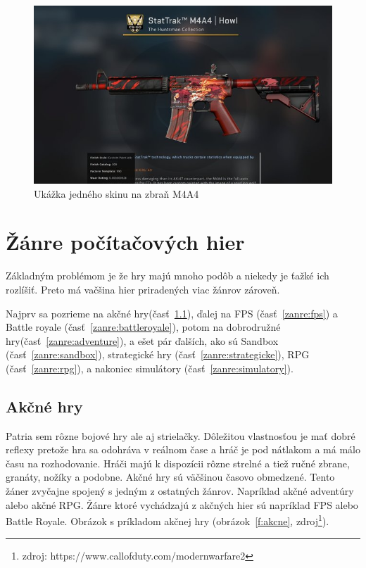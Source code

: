 \documentclass[10pt,oneside,slovak,a4paper]{article}
\begin{document}
\begin{figure}[tbh]
\centering
\includegraphics[scale=0.45]{skin.jpg}
\caption{Ukážka jedného skinu na zbraň M4A4}
\label{f:skiny}
\end{figure}



\section{Žánre počítačových hier} \label{zanre}

Základným problémom je že hry majú mnoho podôb a niekedy je ťažké ich rozlíšiť. Preto má vačšina hier priradených viac žánrov zároveň.

Najprv sa pozrieme na akčné hry(časť~\ref{zanre:akcne}), ďalej na FPS (časť~\ref{zanre:fps}) a Battle royale (časť~\ref{zanre:battleroyale}), potom na dobrodružné hry(časť~\ref{zanre:adventure}), a ešet pár ďalších, ako sú Sandbox (časť~\ref{zanre:sandbox}), strategické hry (časť~\ref{zanre:strategicke}), RPG (časť~\ref{zanre:rpg}), a nakoniec simulátory (časť~\ref{zanre:simulatory}).


\subsection{Akčné hry} \label{zanre:akcne}

Patria sem rôzne bojové hry ale aj strielačky. Dôležitou vlastnosťou je mať dobré reflexy pretože hra sa odohráva v reálnom čase a hráč je pod nátlakom a má málo času na rozhodovanie. Hráči majú k dispozícii rôzne strelné a tiež ručné zbrane, granáty, nožíky a podobne. Akčné hry sú väčšinou časovo obmedzené. Tento žáner zvyčajne spojený s jedným z ostatných žánrov. Napríklad akčné adventúry alebo akčné RPG. Žánre ktoré vychádzajú z akčných hier sú napríklad FPS alebo Battle Royale. Obrázok s príkladom akčnej hry (obrázok~\ref{f:akcne}, zdroj\footnote{zdroj: https://www.callofduty.com/modernwarfare2}).
\end{document}
